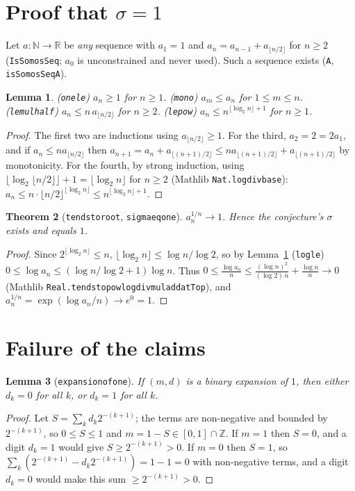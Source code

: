 \documentclass[11pt]{article}
\newtheorem{theorem}{Theorem}
\newtheorem{lemma}[theorem]{Lemma}
\theoremstyle{definition}
\theoremstyle{remark}
\renewcommand{\_}{\oldus\allowbreak}
\begin{document}
\section{Proof that $\sigma = 1$}

Let $a:\mathbb N\to\mathbb R$ be \emph{any} sequence with $a_1 = 1$ and $a_n = a_{n-1} + a_{\lfloor n/2\rfloor}$
for $n\ge 2$ (\texttt{IsSomosSeq}; $a_0$ is unconstrained and never used). Such a sequence exists
(\texttt{A}, \texttt{isSomosSeq\_A}).

\begin{lemma}\label{l:basic}
(\texttt{one\_le}) $a_n \ge 1$ for $n\ge1$. (\texttt{mono}) $a_m \le a_n$ for $1\le m\le n$.
(\texttt{le\_mul\_half}) $a_n \le n\,a_{\lfloor n/2\rfloor}$ for $n\ge 2$.
(\texttt{le\_pow}) $a_n \le n^{\lfloor \log_2 n\rfloor + 1}$ for $n \ge 1$.
\end{lemma}
\begin{proof}
The first two are inductions using $a_{\lfloor n/2\rfloor} \ge 1$. For the third, $a_2 = 2 = 2a_1$, and if
$a_n \le n a_{\lfloor n/2\rfloor}$ then
$a_{n+1} = a_n + a_{\lfloor (n+1)/2\rfloor} \le n a_{\lfloor (n+1)/2\rfloor} + a_{\lfloor (n+1)/2\rfloor}$ by
monotonicity. For the fourth, by strong induction, using
$\lfloor\log_2\lfloor n/2\rfloor\rfloor + 1 = \lfloor \log_2 n\rfloor$ for $n\ge 2$ (Mathlib
\texttt{Nat.log\_div\_base}): $a_n \le n\cdot \lfloor n/2\rfloor^{\lfloor\log_2 n\rfloor}\le n^{\lfloor\log_2 n\rfloor+1}$.
\end{proof}

\begin{theorem}[\texttt{tendsto\_root}, \texttt{sigma\_eq\_one}]
$a_n^{1/n} \to 1$. Hence the conjecture's $\sigma$ exists and equals $1$.
\end{theorem}
\begin{proof}
Since $2^{\lfloor\log_2 n\rfloor}\le n$, $\lfloor\log_2 n\rfloor \le \log n/\log 2$, so by Lemma~\ref{l:basic}
(\texttt{log\_le}) $0 \le \log a_n \le (\log n/\log 2 + 1)\log n$. Thus
$0 \le \frac{\log a_n}{n} \le \frac{(\log n)^2}{(\log 2)\, n} + \frac{\log n}{n} \to 0$ (Mathlib
\texttt{Real.tendsto\_pow\_log\_div\_mul\_add\_atTop}), and $a_n^{1/n} = \exp(\log a_n / n) \to e^0 = 1$.
\end{proof}

\section{Failure of the claims}

\begin{lemma}[\texttt{expansion\_of\_one}]
If $(m,d)$ is a binary expansion of $1$, then either $d_k = 0$ for all $k$, or $d_k = 1$ for all $k$.
\end{lemma}
\begin{proof}
Let $S = \sum_k d_k 2^{-(k+1)}$; the terms are non-negative and bounded by $2^{-(k+1)}$, so
$0 \le S\le 1$ and $m = 1 - S \in [0,1]\cap\mathbb Z$. If $m = 1$ then $S = 0$, and a digit $d_k = 1$
would give $S \ge 2^{-(k+1)} > 0$. If $m = 0$ then $S = 1$, so
$\sum_k (2^{-(k+1)} - d_k 2^{-(k+1)}) = 1 - 1 = 0$ with non-negative terms, and a digit $d_k = 0$ would
make this sum $\ge 2^{-(k+1)} > 0$.
\end{proof}
\end{document}
